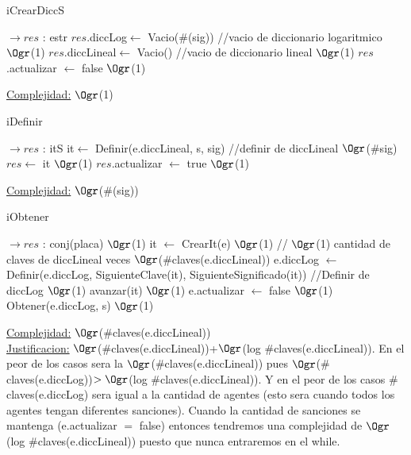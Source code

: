 \begin{Representacion}
\begin{Algoritmos}
	
	\begin{algorithm}[H]
		\caption{iCrearDiccS}
		\begin{algorithmic}[1]
			 $\to res$ : estr
			\State $res$.diccLog$\leftarrow$ Vacio($\#$(sig)) //vacio de diccionario logaritmico \Comment $\Ogr$(1)
			\State $res$.diccLineal$\leftarrow$ Vacio() //vacio de diccionario lineal \Comment $\Ogr$(1)
			\State $res$.actualizar $\leftarrow$ false \Comment $\Ogr$(1) 
			\EndProcedure
		\end{algorithmic}
		\underline{Complejidad:} $\Ogr$(1)
	\end{algorithm}
	
	\begin{algorithm}[H]
		\caption{iDefinir}
		\begin{algorithmic}[1]
			 $\to res$ : itS
			\State it$\leftarrow$ Definir(e.diccLineal, s, sig) //definir de diccLineal \Comment $\Ogr$($\#$sig)
			\State $res \leftarrow$ it \Comment $\Ogr$(1)
			\State $res$.actualizar $\leftarrow$ true \Comment $\Ogr$(1) 
			\EndProcedure
		\end{algorithmic}
		\underline{Complejidad:} $\Ogr$($\#$(sig))
	\end{algorithm}

	\begin{algorithm}[H]
		\caption{iObtener}
		\begin{algorithmic}[1]
			 $\to res$ : conj(placa)
			 \Comment $\Ogr$(1)
				\State it $\leftarrow$ CrearIt(e) \Comment $\Ogr$(1)
				 // $\Ogr$(1) cantidad de claves de diccLineal veces \Comment $\Ogr$($\#$claves(e.diccLineal))
					\State e.diccLog $\leftarrow$ Definir(e.diccLog, SiguienteClave(it), SiguienteSignificado(it)) //Definir de diccLog \Comment $\Ogr$(1) 
					\State avanzar(it) \Comment $\Ogr$(1) 
				\EndWhile
				\State e.actualizar $\leftarrow$ false \Comment $\Ogr$(1) 
			\EndIf
			\State Obtener(e.diccLog, s) $\Ogr$(1)
			\EndProcedure
		\end{algorithmic}
		\underline{Complejidad:} $\Ogr$($\#$claves(e.diccLineal))
		\\
		\underline{Justificacion:} $\Ogr$($\#$claves(e.diccLineal))+$\Ogr$(log $\#$claves(e.diccLineal)). En el peor de los casos sera la $\Ogr$($\#$claves(e.diccLineal)) pues $\Ogr$($\#$claves(e.diccLog))$>\Ogr$(log $\#$claves(e.diccLineal)). Y en el peor de los casos $\#$claves(e.diccLog) sera igual a la cantidad de agentes (esto sera cuando todos los agentes tengan diferentes sanciones). Cuando la cantidad de sanciones se mantenga (e.actualizar $=$ false) entonces tendremos una complejidad de $\Ogr$(log $\#$claves(e.diccLineal)) puesto que nunca entraremos en el while.
	\end{algorithm}	
	
	
\end{Algoritmos}
\end{Representacion}